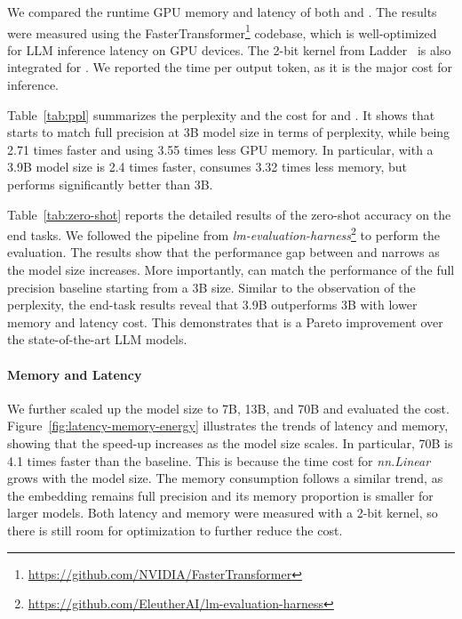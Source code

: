 We compared the runtime GPU memory and latency of both  and . The results were measured using the FasterTransformer\footnote{\url{https://github.com/NVIDIA/FasterTransformer}} codebase, which is well-optimized for LLM inference latency on GPU devices. The 2-bit kernel from Ladder~\cite{ladder} is also integrated for . We reported the time per output token, as it is the major cost for inference.

Table~\ref{tab:ppl} summarizes the perplexity and the cost for  and . It shows that  starts to match full precision  at 3B model size in terms of perplexity, while being 2.71 times faster and using 3.55 times less GPU memory. In particular,  with a 3.9B model size is 2.4 times faster, consumes 3.32 times less memory, but performs significantly better than  3B. 

Table~\ref{tab:zero-shot} reports the detailed results of the zero-shot accuracy on the end tasks. We followed the pipeline from \emph{lm-evaluation-harness}\footnote{\url{https://github.com/EleutherAI/lm-evaluation-harness}} to perform the evaluation. The results show that the performance gap between  and  narrows as the model size increases. More importantly,  can match the performance of the full precision baseline starting from a 3B size. Similar to the observation of the perplexity, the end-task results reveal that  3.9B outperforms  3B with lower memory and latency cost. This demonstrates that  is a Pareto improvement over the state-of-the-art LLM models.

\paragraph{Memory and Latency}

We further scaled up the model size to 7B, 13B, and 70B and evaluated the cost. Figure~\ref{fig:latency-memory-energy} illustrates the trends of latency and memory, showing that the speed-up increases as the model size scales. In particular,  70B is 4.1 times faster than the  baseline. This is because the time cost for \emph{nn.Linear} grows with the model size. The memory consumption follows a similar trend, as the embedding remains full precision and its memory proportion is smaller for larger models. Both latency and memory were measured with a 2-bit kernel, so there is still room for optimization to further reduce the cost.


